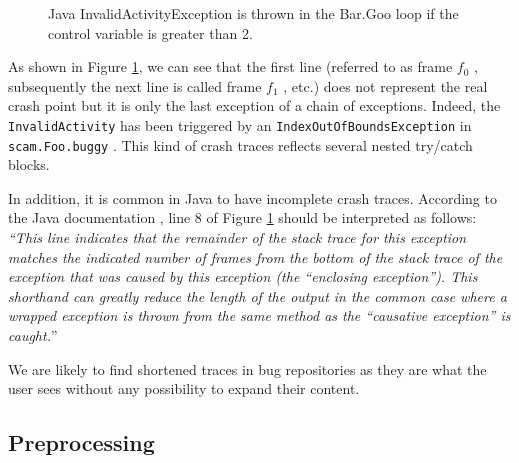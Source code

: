 \documentclass[times]{smrauth}
\begin{document}
\begin{figure}[h!]
  \noindent{}
    \caption{Java InvalidActivityException is thrown in the Bar.Goo loop if the control variable is greater than 2.
    \label{fig:jcarming-traces}}
\end{figure}

As shown in Figure \ref{fig:jcarming-traces}, we can see that the first line (referred to
as frame {\it $f_0$} , subsequently the next line is called frame {\it $f_1$} , etc.)
does not represent the real crash point but it is only the last
exception of a chain of exceptions. Indeed, the {\tt InvalidActivity}
has been triggered by an {\tt IndexOutOfBoundsException} in
{\tt scam.Foo.buggy} . This kind of crash traces reflects several
nested try/catch blocks.

In addition, it is common in Java to have incomplete crash
traces. According to the Java documentation \cite{Oracle2011}, line 8 of
Figure \ref{fig:jcarming-traces} should be interpreted as follows: {\it ``This line indicates
that the remainder of the stack trace for this exception
matches the indicated number of frames from the bottom of the
stack trace of the exception that was caused by this exception
(the ``enclosing exception''). This shorthand can greatly
reduce the length of the output in the common case where a
wrapped exception is thrown from the same method as the
``causative exception'' is caught.}''

We are likely to find shortened traces in bug repositories as
they are what the user sees without any possibility to expand
their content.

\subsection{Preprocessing}
\end{document}
